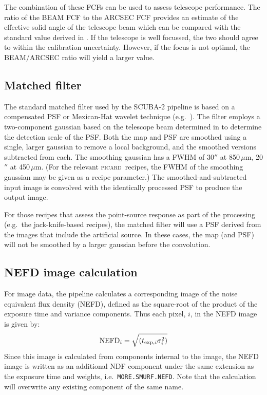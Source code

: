 \documentclass[twoside,11pt]{article}
\renewcommand{\_}{\texttt{\symbol{95}}}
\newcommand{\picard}{\textsc{picard}}
\begin{document}
The combination of these FCFs can be used to assess telescope
performance. The ratio of the BEAM FCF to the ARCSEC FCF provides an
estimate of the effective solid angle of the telescope beam which can
be compared with the standard value derived in
\cite{scuba2calpaper}. If the telescope is well focussed, the two
should agree to within the calibration uncertainty. However, if the
focus is not optimal, the BEAM/ARCSEC ratio will yield a larger value.

\subsection{Matched filter}

The standard matched filter used by the SCUBA-2 pipeline is based on a
compensated PSF or Mexican-Hat wavelet technique
(e.g.\ \cite{mhwpaper}). The filter employs a two-component gaussian
based on the telescope beam determined in \cite{scuba2calpaper} to
determine the detection scale of the PSF. Both the map and PSF are
smoothed using a single, larger gaussian to remove a local background,
and the smoothed versions subtracted from each. The smoothing gaussian
has a FWHM of 30$''$ at 850\,$\mu$m, 20$''$ at 450\,$\mu$m. (For the
relevant \picard\ recipes, the FWHM of the smoothing gaussian may be
given as a recipe parameter.) The smoothed-and-subtracted input image
is convolved with the identically processed PSF to produce the output
image.

For those recipes that assess the point-source response as part of the
processing (e.g.\ the jack-knife-based recipes), the matched filter
will use a PSF derived from the images that include the artificial
source. In these cases, the map (and PSF) will not be smoothed by a
larger gaussian before the convolution.

\subsection{NEFD image calculation}

For image data, the pipeline calculates a corresponding image of the
noise equivalent flux density (NEFD), defined as the square-root of
the product of the exposure time and variance components. Thus each
pixel, $i$, in the NEFD image is given by:
\begin{equation}
{\rm NEFD}_i = \sqrt{(t_{{\rm exp},i} \sigma_i^2)}
\end{equation}
Since this image is calculated from components internal to the image,
the NEFD image is written as an additional NDF component under the
same extension as the exposure time and weights, i.e.\,
\verb+MORE.SMURF.NEFD+. Note that the calculation will overwrite
any existing component of the same name.
\end{document}
